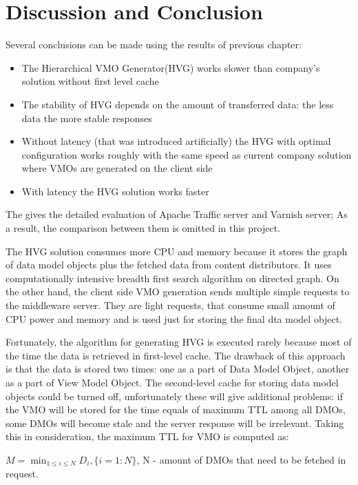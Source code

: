 \newpage
\section{Discussion and Conclusion}
	
Several conclusions can be made using the results of previous chapter: 

\begin{itemize}
	\item The Hierarchical VMO Generator(HVG) works slower than company's solution without first level cache
	\item The stability of HVG depends on the amount of transferred data: the less data the more stable responses
	\item Without latency (that was introduced artificially) the HVG with optimal configuration works roughly with the same speed as current company solution where VMOs are generated on the client side
	\item With latency the HVG solution works faster 
\end{itemize}

The \cite{VarnApacheReverse} gives the detailed evaluation of Apache Traffic server and Varnish server; As a result, the comparison between them is omitted in this project. 

The HVG solution consumes more CPU and memory because it stores the graph of data model objects plus the fetched data from content distributors. It uses computationally intensive breadth first search algorithm on directed graph. On the other hand, the client side VMO generation sends multiple simple requests to the middleware server. They are light requests, that consume small amount of CPU power and memory and is used just for storing the final dta model object.

Fortunately, the algorithm for generating HVG is executed rarely because most of the time the data is retrieved in first-level cache. The drawback of this approach is that the data is stored two times: one as a part of Data Model Object, another as a part of View Model Object. The second-level cache for storing data model objects could be turned off, unfortunately these will give additional problems: if the VMO will be stored for the time equals of maximum TTL among all DMOs, some DMOs will become stale and the server response will be irrelevant. Taking this in consideration, the maximum TTL for VMO is computed as:

\begin{center}
	\begin{math}M = \min_{1 \leq i \leq N} D_{i},\{i=1:N\}\end{math}, N - amount of DMOs that need to be fetched in request.
\end{center}

